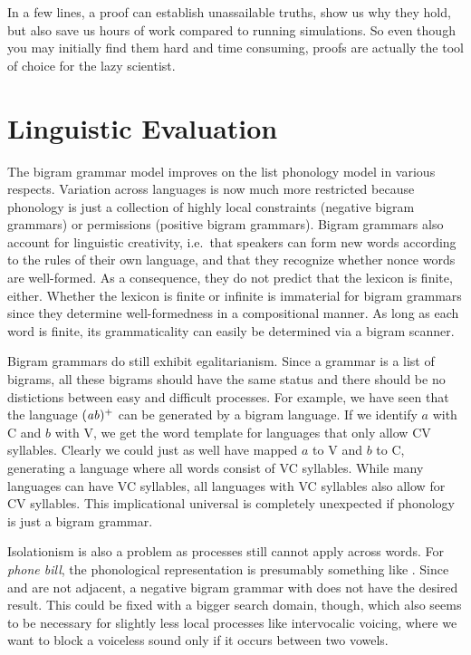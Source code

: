 In a few lines, a proof can establish unassailable truths, show us why they hold, but also save us hours of work compared to running simulations.
So even though you may initially find them hard and time consuming, proofs are actually the tool of choice for the lazy scientist.


\section{Linguistic Evaluation}
The bigram grammar model improves on the list phonology model in various respects.
Variation across languages is now much more restricted because phonology is just a collection of highly local constraints (negative bigram grammars) or permissions (positive bigram grammars).
Bigram grammars also account for linguistic creativity, i.e.\ that speakers can form new words according to the rules of their own language, and that they recognize whether nonce words are well-formed.
As a consequence, they do not predict that the lexicon is finite, either.
Whether the lexicon is finite or infinite is immaterial for bigram grammars since they determine well-formedness in a compositional manner.
As long as each word is finite, its grammaticality can easily be determined via a bigram scanner.

Bigram grammars do still exhibit egalitarianism.
Since a grammar is a list of bigrams, all these bigrams should have the same status and there should be no distictions between easy and difficult processes.
For example, we have seen that the language $(\mathit{ab})^+$ can be generated by a bigram language.
If we identify $a$ with C and $b$ with V, we get the word template for languages that only allow CV syllables.
Clearly we could just as well have mapped $a$ to V and $b$ to C, generating a language where all words consist of VC syllables.
While many languages can have VC syllables, all languages with VC syllables also allow for CV syllables.
This implicational universal is completely unexpected if phonology is just a bigram grammar.

Isolationism is also a problem as processes still cannot apply across words.
For \emph{phone bill}, the phonological representation is presumably something like \LeftEdge{}\RightEdge\LeftEdge{}\RightEdge.
Since  and  are not adjacent, a negative bigram grammar with  does not have the desired result.
This could be fixed with a bigger search domain, though, which also seems to be necessary for slightly less local processes like intervocalic voicing, where we want to block a voiceless sound only if it occurs between two vowels.

